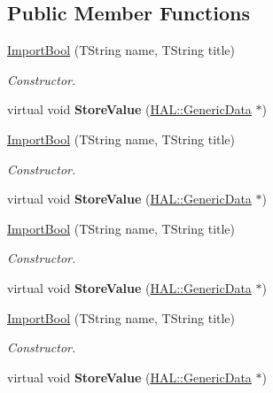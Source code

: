 \subsection*{Public Member Functions}
\begin{DoxyCompactItemize}
\item 
\hyperlink{class_h_a_l_1_1_algorithms_1_1_import_bool_a060a260af56afe85c10ff992a0a8b3fa}{Import\+Bool} (T\+String name, T\+String title)
\begin{DoxyCompactList}\small\item\em Constructor. \end{DoxyCompactList}\item 
\hypertarget{class_h_a_l_1_1_algorithms_1_1_import_bool_a5cb75ed42fe19b3c406d8defbf8aaa4f}{virtual void {\bfseries Store\+Value} (\hyperlink{class_h_a_l_1_1_generic_data}{H\+A\+L\+::\+Generic\+Data} $\ast$)}\label{class_h_a_l_1_1_algorithms_1_1_import_bool_a5cb75ed42fe19b3c406d8defbf8aaa4f}

\item 
\hyperlink{class_h_a_l_1_1_algorithms_1_1_import_bool_a060a260af56afe85c10ff992a0a8b3fa}{Import\+Bool} (T\+String name, T\+String title)
\begin{DoxyCompactList}\small\item\em Constructor. \end{DoxyCompactList}\item 
\hypertarget{class_h_a_l_1_1_algorithms_1_1_import_bool_a5cb75ed42fe19b3c406d8defbf8aaa4f}{virtual void {\bfseries Store\+Value} (\hyperlink{class_h_a_l_1_1_generic_data}{H\+A\+L\+::\+Generic\+Data} $\ast$)}\label{class_h_a_l_1_1_algorithms_1_1_import_bool_a5cb75ed42fe19b3c406d8defbf8aaa4f}

\item 
\hyperlink{class_h_a_l_1_1_algorithms_1_1_import_bool_a060a260af56afe85c10ff992a0a8b3fa}{Import\+Bool} (T\+String name, T\+String title)
\begin{DoxyCompactList}\small\item\em Constructor. \end{DoxyCompactList}\item 
\hypertarget{class_h_a_l_1_1_algorithms_1_1_import_bool_a5cb75ed42fe19b3c406d8defbf8aaa4f}{virtual void {\bfseries Store\+Value} (\hyperlink{class_h_a_l_1_1_generic_data}{H\+A\+L\+::\+Generic\+Data} $\ast$)}\label{class_h_a_l_1_1_algorithms_1_1_import_bool_a5cb75ed42fe19b3c406d8defbf8aaa4f}

\item 
\hyperlink{class_h_a_l_1_1_algorithms_1_1_import_bool_a060a260af56afe85c10ff992a0a8b3fa}{Import\+Bool} (T\+String name, T\+String title)
\begin{DoxyCompactList}\small\item\em Constructor. \end{DoxyCompactList}\item 
\hypertarget{class_h_a_l_1_1_algorithms_1_1_import_bool_a5cb75ed42fe19b3c406d8defbf8aaa4f}{virtual void {\bfseries Store\+Value} (\hyperlink{class_h_a_l_1_1_generic_data}{H\+A\+L\+::\+Generic\+Data} $\ast$)}\label{class_h_a_l_1_1_algorithms_1_1_import_bool_a5cb75ed42fe19b3c406d8defbf8aaa4f}


\end{DoxyCompactItemize}
